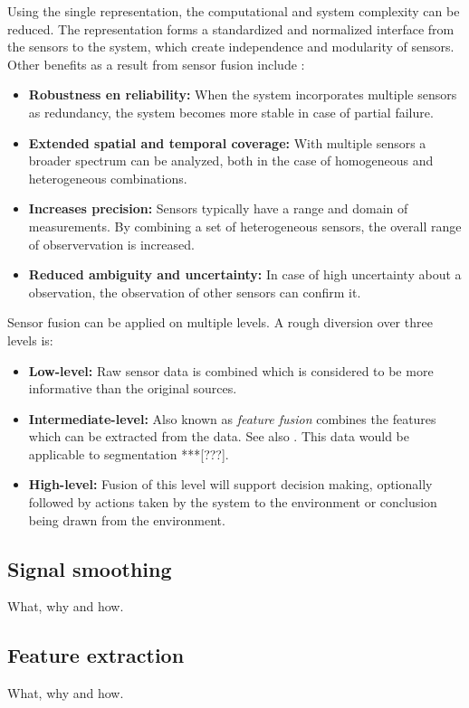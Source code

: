     Using the single representation, the computational and system complexity can be reduced.
    The representation forms a standardized and normalized interface from the sensors to the system, which create independence and modularity of sensors.
    Other benefits as a result from sensor fusion include \cite{elmenreich2001introduction}:
    \begin{itemize}
      \item \textbf{Robustness en reliability:} When the system incorporates multiple sensors as redundancy, the system becomes more stable in case of partial failure.
      \item \textbf{Extended spatial and temporal coverage:} With multiple sensors a broader spectrum can be analyzed, both in the case of homogeneous and heterogeneous combinations.
      \item \textbf{Increases precision:} Sensors typically have a range and domain of measurements.
      By combining a set of heterogeneous sensors, the overall range of observervation is increased.
      \item \textbf{Reduced ambiguity and uncertainty:} In case of high uncertainty about a observation, the observation of other sensors can confirm it.
    \end{itemize}

    Sensor fusion can be applied on multiple levels. A rough diversion over three levels is:
    \begin{itemize}
      \item \textbf{Low-level:} Raw sensor data is combined which is considered to be more informative than the original sources.
      \item \textbf{Intermediate-level:} Also known as \emph{feature fusion} combines the features which can be extracted from the data.
      See also .
      This data would be applicable to segmentation ***[???].
      \item \textbf{High-level:} Fusion of this level will support decision making, optionally followed by actions taken by the system to the environment or conclusion being drawn from the environment.
    \end{itemize}


    \subsection{Signal smoothing}
    What, why and how.

    \subsection{Feature extraction}
    \label{sec:feature_extraction}
    What, why and how.